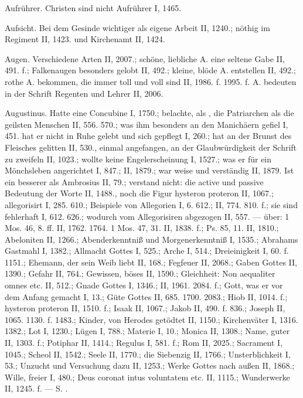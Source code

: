 Aufrührer. Christen sind nicht Aufrührer I, 1465.

Aufsicht. Bei dem Gesinde wichtiger als eigene Arbeit II, 1240.; nöthig im Regiment II, 1423. und Kirchenamt II, 1424.

Augen. Verschiedene Arten II, 2007.; schöne, liebliche A. eine seltene Gabe II, 491. f.; Falkenaugen besonders gelobt II, 492.; kleine, blöde A. entstellen II, 492.; rothe A. bekommen, die immer toll und voll sind II, 1986. f. 1995. f. A. bedeuten in der Schrift Regenten und Lehrer II, 2006.

Augustinus. Hatte  eine Concubine I, 1750.; belachte, als , die Patriarchen als die geilsten Menschen II, 556. 570.; was ihm besonders an den Manichäern gefiel I, 451.  hat er nicht in Ruhe gelebt und sich gepflegt I, 260.; hat an der Brunst des Fleisches gelitten II, 530., einmal angefangen, an der Glaubwürdigkeit der Schrift zu zweifeln II, 1023.; wollte keine Engelerscheinung I, 1527.; was er für ein Mönchsleben angerichtet I, 847.; II, 1879.; war weise und verständig II, 1879. Ist ein besserer  als Ambrosius II, 79.; verstand nicht: die active und passive Bedeutung der Worte II, 1488., noch die Figur hysteron proteron II, 1067.; allegorisirt I, 285. 610.; Beispiele von Allegorien I, 6. 612.; II, 774. 810. f.; sie sind fehlerhaft I, 612. 626.; wodurch vom Allegorisiren abgezogen II, 557. —  über: 1 Mos. 46, 8. ff. II, 1762. 1764. 1 Mos. 47, 31. II, 1838. f.; Ps. 85, 11. II, 1810.; Abeloniten II, 1266.; Abenderkenntniß und Morgenerkenntniß I, 1535.; Abrahams Gastmahl I, 1382.; Allmacht Gottes I, 525.; Arche I, 514.; Dreieinigkeit I, 60. f. 1151.; Ehemann, der sein Weib liebt II, 168.; Fegfeuer II, 2068.; Gaben Gottes II, 1390.; Gefahr II, 764.; Gewissen, böses II, 1590.; Gleichheit: Non aequaliter omnes etc. II, 512.; Gnade Gottes I, 1346.; II, 1961. 2084. f.; Gott, was er vor dem Anfang gemacht I, 13.; Güte Gottes II, 685. 1700. 2083.; Hiob II, 1014. f.; hysteron proteron II, 1510. f.; Isaak II, 1067.; Jakob II, 490. f. 836.; Joseph II, 1065. 1130. f. 1483.; Kinder, von Herodes getödtet II, 1150.; Kirchenväter I, 1316. 1382.; Lot I, 1230.; Lügen I, 788.; Materie I, 10.; Monica II, 1308.; Name, guter II, 1303. f.; Potiphar II, 1414.; Regulus I, 581. f.; Rom II, 2025.; Sacrament I, 1045.; Scheol II, 1542.; Seele II, 1770.; die Siebenzig II, 1766.; Unsterblichkeit I, 53.; Unzucht und Versuchung dazu II, 1253.; Werke Gottes nach außen II, 1868.; Wille, freier I, 480.; Deus coronat intus voluntatem etc. II, 1115.; Wunderwerke II, 1245. f. — S. .

